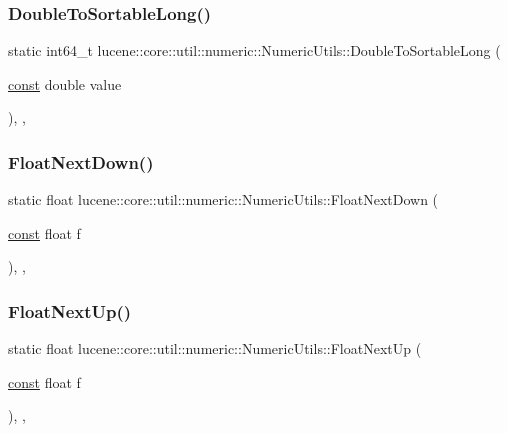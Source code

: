 \subsubsection{\texorpdfstring{Double\+To\+Sortable\+Long()}{DoubleToSortableLong()}}
{\footnotesize\ttfamily static int64\+\_\+t lucene\+::core\+::util\+::numeric\+::\+Numeric\+Utils\+::\+Double\+To\+Sortable\+Long (\begin{DoxyParamCaption}\item[{\mbox{\hyperlink{ZlibCrc32_8h_a2c212835823e3c54a8ab6d95c652660e}{const}} double}]{value }\end{DoxyParamCaption})\hspace{0.3cm}{\ttfamily [inline]}, {\ttfamily [static]}, {\ttfamily [noexcept]}}

\mbox{\label{classlucene_1_1core_1_1util_1_1numeric_1_1NumericUtils_ad3cb64d9fdf2f28dbe3ea94e57558ec5}} 
\subsubsection{\texorpdfstring{Float\+Next\+Down()}{FloatNextDown()}}
{\footnotesize\ttfamily static float lucene\+::core\+::util\+::numeric\+::\+Numeric\+Utils\+::\+Float\+Next\+Down (\begin{DoxyParamCaption}\item[{\mbox{\hyperlink{ZlibCrc32_8h_a2c212835823e3c54a8ab6d95c652660e}{const}} float}]{f }\end{DoxyParamCaption})\hspace{0.3cm}{\ttfamily [inline]}, {\ttfamily [static]}, {\ttfamily [noexcept]}}

\mbox{\label{classlucene_1_1core_1_1util_1_1numeric_1_1NumericUtils_ad613ebe1b53d3d3a461a549ed6ab1742}} 
\subsubsection{\texorpdfstring{Float\+Next\+Up()}{FloatNextUp()}}
{\footnotesize\ttfamily static float lucene\+::core\+::util\+::numeric\+::\+Numeric\+Utils\+::\+Float\+Next\+Up (\begin{DoxyParamCaption}\item[{\mbox{\hyperlink{ZlibCrc32_8h_a2c212835823e3c54a8ab6d95c652660e}{const}} float}]{f }\end{DoxyParamCaption})\hspace{0.3cm}{\ttfamily [inline]}, {\ttfamily [static]}, {\ttfamily [noexcept]}}

